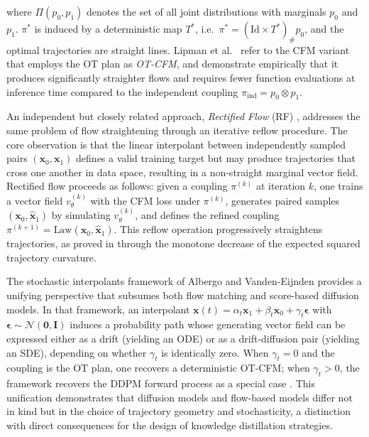 \noindent where $\Pi(p_0, p_1)$ denotes the set of all joint distributions with
marginals $p_0$ and $p_1$. $\pi^*$ is induced by a deterministic map $T^*$, i.e.\
$\pi^* = (\text{Id} \times T^*)_\# p_0$, and the optimal trajectories are straight
lines. Lipman et al.\ \cite{lipman2022flow} refer to the CFM variant that employs the
OT plan as \emph{OT-CFM}, and demonstrate empirically that it produces significantly
straighter flows and requires fewer function evaluations at inference time compared to
the independent coupling $\pi_{\text{ind}} = p_0 \otimes p_1$.

An independent but closely related approach, \emph{Rectified Flow} (RF) \cite{liu2022flow},
addresses the same problem of flow straightening through an iterative reflow procedure.
The core observation is that the linear interpolant between independently sampled pairs
$(\mathbf{x}_0, \mathbf{x}_1)$ defines a valid training target but may produce
trajectories that cross one another in data space, resulting in a non-straight marginal
vector field. Rectified flow proceeds as follows: given a coupling $\pi^{(k)}$ at
iteration $k$, one trains a vector field $v_\theta^{(k)}$ with the CFM loss under
$\pi^{(k)}$, generates paired samples $(\mathbf{x}_0, \hat{\mathbf{x}}_1)$ by
simulating $v_\theta^{(k)}$, and defines the refined coupling
$\pi^{(k+1)} = \text{Law}(\mathbf{x}_0, \hat{\mathbf{x}}_1)$. This reflow operation
progressively straightens trajectories, as proved in \cite{liu2022flow} through the
monotone decrease of the expected squared trajectory curvature.

The stochastic interpolants framework of Albergo and Vanden-Eijnden
\cite{albergo2023building} provides a unifying perspective that subsumes both flow
matching and score-based diffusion models. In that framework, an interpolant
$\mathbf{x}(t) = \alpha_t \mathbf{x}_1 + \beta_t \mathbf{x}_0 + \gamma_t \boldsymbol{\epsilon}$
with $\boldsymbol{\epsilon} \sim \mathcal{N}(\mathbf{0}, \mathbf{I})$ induces a
probability path whose generating vector field can be expressed either as a drift
(yielding an ODE) or as a drift-diffusion pair (yielding an SDE), depending on whether
$\gamma_t$ is identically zero. When $\gamma_t = 0$ and the coupling is the OT plan,
one recovers a deterministic OT-CFM; when $\gamma_t > 0$, the framework recovers
the DDPM forward process as a special case \cite{ho2020denoising}. This unification
demonstrates that diffusion models and flow-based models differ not in kind but in the
choice of trajectory geometry and stochasticity, a distinction with direct consequences
for the design of knowledge distillation strategies.

